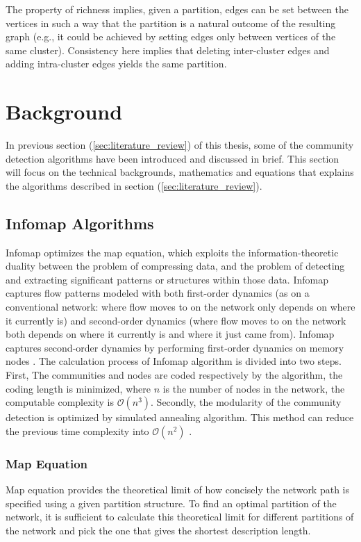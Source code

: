 {The property of richness implies, given a partition, edges can be set between the vertices in such a way that the partition is a natural outcome of the resulting graph (e.g., it could be achieved by setting edges only between vertices of the same cluster). Consistency here implies that deleting inter-cluster edges and adding intra-cluster edges yields the same partition.


\section{Background}
In previous section (\ref{sec:literature_review}) of this thesis, some of the community detection algorithms have been introduced and discussed in brief. This section will focus on the technical backgrounds, mathematics and equations that explains the algorithms described in section (\ref{sec:literature_review}).

\subsection{Infomap Algorithms}\label{infomap_algorithms}
Infomap optimizes the map equation, which exploits the information-theoretic duality between the problem of compressing data, and the problem of detecting and extracting significant patterns or structures within those data. Infomap captures flow patterns modeled with both first-order dynamics (as on a conventional network: where flow moves to on the network only depends on where it currently is) and second-order dynamics (where flow moves to on the network both depends on where it currently is and where it just came from). Infomap
captures second-order dynamics by performing first-order dynamics on memory nodes \cite{ref-46}. The calculation process of Infomap algorithm is divided into two steps. First, The communities and nodes are coded respectively by the algorithm, the coding length is minimized, where $n$ is the number of nodes in the network, the computable complexity is $\mathcal{O}(n^3)$. Secondly, the modularity of the community detection is optimized by simulated annealing algorithm. This method can reduce the previous time complexity into $\mathcal{O}(n^2)$ \cite{ref-48}.

\subsubsection*{Map Equation}\label{subsec:map_equation}
Map equation provides the theoretical limit of how concisely the network path is specified using a given partition structure. To find an optimal partition of the network, it is sufficient to calculate this theoretical limit for different partitions of the network and pick the one that gives the shortest description length.

}
